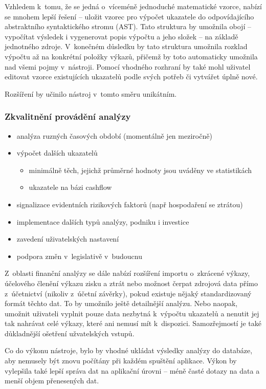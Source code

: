 Vzhledem k~tomu, že se jedná o~víceméně jednoduché matematické vzorce, nabízí se mnohem lepší řešení -- uložit vzorec pro výpočet ukazatele do odpovídajícího abstraktního syntaktického stromu (AST). Tato struktura by umožnila obojí -- vypočítat výsledek i vygenerovat popis výpočtu a jeho složek -- na základě jednotného zdroje. V~konečném důsledku by tato struktura umožnila rozklad výpočtu až na konkrétní položky výkazů, přičemž by toto automaticky umožnila nad všemi pojmy v~nástroji. Pomocí vhodného rozhraní by také mohl uživatel editovat vzorce existujících ukazatelů podle svých potřeb či vytvářet úplně nové.

Rozšíření by učinilo nástroj v~tomto směru unikátním.

\subsubsection{Zkvalitnění provádění analýzy}
\begin{itemize}
  \item analýza ruzných časových období (momentálně jen meziročně)
  \item výpočet dalších ukazatelů
  \begin{itemize}
    \item minimálně těch, jejichž průměrné hodnoty jsou uváděny ve statistikách
    \item ukazatele na bázi cashflow
  \end{itemize}
  \item signalizace evidentních rizikových faktorů (např hospodaření se ztrátou)
  \item implementace dalších typů analýzy, podniku i investice
  \item zavedení uživatelských nastavení
  \item podpora změn v~legislativě v~budoucnu
\end{itemize}

Z~oblasti finanční analýzy se dále nabízí rozšíření importu o~zkrácené výkazy, účelového členění výkazu zisku a ztrát nebo možnost čerpat zdrojová data přímo z~účetnictví (nikoliv z~účetní závěrky), pokud existuje nějaký standardizovaný formát těchto dat. To by umožnilo ještě detailnější analýzu. Nebo naopak, umožnit uživateli vyplnit pouze data nezbytná k~výpočtu ukazatelů a nenutit jej tak nahrávat celé výkazy, které ani nemusí mít k~dispozici. Samozřejmostí je také důkladnější ošetření užvatelských vstupů.

Co do výkonu nástroje, bylo by vhodné ukládat výsledky analýzy do databáze, aby nemusely být znovu počítány při každém spuštění aplikace. Výkon by vylepšila také lepší správa dat na aplikační úrovni -- méně časté dotazy na data a menší objem přenesených dat.


